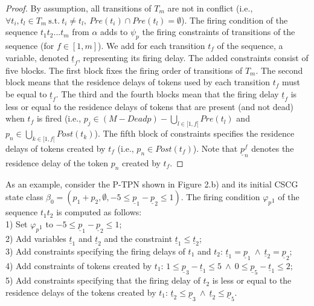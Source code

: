 \documentclass[submission,copyright,creativecommons]{eptcs}
\newtheorem{proof}{Proof}
\numberwithin{equation}{section}
\begin{document}
\begin{proof} By assumption, all transitions of $T_m$ are not in conflict (i.e., $\forall t_{i}, t_{l} \in T_m \ \text{s.t.} \ t_i \neq t_l, \ Pre(t_{i}) \cap Pre(t_{l})= \emptyset$). The firing condition of the sequence $t_{1} t_{2} ...  t_{m}$ from $\alpha$ adds to $\psi_p$ the firing constraints of transitions of the sequence (for $f \in [1,m]$). We add for each transition  $t_{f}$ of the sequence, a variable, denoted $\underline{t}_f$, representing its firing delay. The added constraints consist of five blocks. The first block fixes the firing order of transitions of $T_m$. The second block means that the residence delays of tokens used by each transition $t_{f}$ must be equal to $\underline{t}_f$. The third and the fourth blocks mean that the firing delay $\underline{t}_f$ is less or equal to the residence delays of tokens that are present (and not dead) when $t_{f}$ is fired (i.e., $p_j \in (M - Deadp) - \underset{l \in [1,f[} \bigcup Pre(t_{l})$ and $p_n \in \underset{k \in [1,f[} \bigcup  Post(t_{k})$). The fifth block of constraints specifies the residence delays of tokens created by $t_{f}$ (i.e., $p_n \in Post(t_f)$). Note that $\underline{p}_{n}^f$ denotes the residence delay of the token $p_n$ created by $t_f$. \normalsize
\end{proof}
\par As an example, consider the P-TPN shown in Figure 2.b) and its
initial CSCG state class $\beta_0=(p_1+p_2, \emptyset, -5 \leq \underline{p}_1 - \underline{p}_2 \leq 1)$. The firing condition $\varphi_p{_1}$ of the sequence $t_1t_2$ is computed as follows:\\
1) Set $\varphi_p{_1}$ to $-5 \leq \underline{p}_1 - \underline{p}_2 \leq 1$;\\
2) Add variables $\underline{t}_1$ and $\underline{t}_2$ and the constraint $   \underline{t}_1 \leq \underline{t}_2$;\\
3) Add constraints specifying the firing delays of $t_1$ and $t_2$:  $\underline{t}_1 = \underline{p}_1 \ \wedge \ \underline{t}_2 = \underline{p}_2$;\\
4) Add constraints of tokens created by $t_1$: $ 1 \leq \underline{p}_3 - \underline{t}_1 \leq 5 \ \wedge \ 0 \leq \underline{p}_5 - \underline{t}_1 \leq 2$;\\
5) Add constraints specifying that the firing delay of $t_2$ is less or equal to the residence delays of the tokens created by $t_1$: $\underline{t}_2 \leq \underline{p}_3 \ \wedge \ \underline{t}_2 \leq \underline{p}_5$.\\
\end{document}
